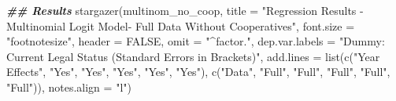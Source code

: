 \documentclass[a4paper,nobind]{templates/ociamthesis}
\newenvironment{Shaded}{\begin{snugshade}}{\end{snugshade}}
\newcommand{\AttributeTok}[1]{\textcolor[rgb]{0.77,0.63,0.00}{#1}}
\newcommand{\ConstantTok}[1]{\textcolor[rgb]{0.00,0.00,0.00}{#1}}
\newcommand{\DocumentationTok}[1]{\textcolor[rgb]{0.56,0.35,0.01}{\textbf{\textit{#1}}}}
\newcommand{\FunctionTok}[1]{\textcolor[rgb]{0.00,0.00,0.00}{#1}}
\newcommand{\NormalTok}[1]{#1}
\newcommand{\StringTok}[1]{\textcolor[rgb]{0.31,0.60,0.02}{#1}}
\renewenvironment{Shaded}
{
  \vspace{10pt}%
  \begin{snugshade}%
}{%
  \end{snugshade}%
  \vspace{8pt}%
}
\begin{document}
\begin{Shaded}
\begin{Highlighting}[]
\DocumentationTok{\#\# Results }
\FunctionTok{stargazer}\NormalTok{(multinom\_no\_coop, }\AttributeTok{title =} \StringTok{"Regression Results {-} Multinomial Logit Model{-} Full Data Without Cooperatives"}\NormalTok{, }\AttributeTok{font.size =} \StringTok{"footnotesize"}\NormalTok{, }\AttributeTok{header =} \ConstantTok{FALSE}\NormalTok{, }\AttributeTok{omit =} \StringTok{"\^{}factor."}\NormalTok{, }\AttributeTok{dep.var.labels =} \StringTok{"Dummy: Current Legal Status (Standard Errors in Brackets)"}\NormalTok{, }\AttributeTok{add.lines =} \FunctionTok{list}\NormalTok{(}\FunctionTok{c}\NormalTok{(}\StringTok{"Year Effects"}\NormalTok{, }\StringTok{"Yes"}\NormalTok{, }\StringTok{"Yes"}\NormalTok{, }\StringTok{"Yes"}\NormalTok{, }\StringTok{"Yes"}\NormalTok{, }\StringTok{"Yes"}\NormalTok{), }\FunctionTok{c}\NormalTok{(}\StringTok{"Data"}\NormalTok{, }\StringTok{"Full"}\NormalTok{, }\StringTok{"Full"}\NormalTok{, }\StringTok{"Full"}\NormalTok{, }\StringTok{"Full"}\NormalTok{, }\StringTok{"Full"}\NormalTok{)), }\AttributeTok{notes.align =} \StringTok{"l"}\NormalTok{)}
\end{Highlighting}
\end{Shaded}
\end{document}
